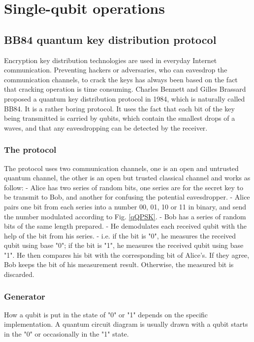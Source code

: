 \documentclass{book}
\begin{document}
\chapter{Single-qubit operations}

\section{BB84 quantum key distribution protocol}
Encryption key distribution technologies are used in everyday Internet communication. Preventing hackers or adversaries, who can eavesdrop the communication channels, to crack the keys has always been based on the fact that cracking operation is time consuming. Charles Bennett and Gilles Brassard proposed a quantum key distribution protocol in 1984, which is naturally called BB84. It is a rather boring protocol. It uses the fact that each bit of the key being transmitted is carried by qubits, which contain the smallest drops of a waves, and that any eavesdropping can be detected by the receiver.

\subsection{The protocol}
The protocol uses two communication channels, one is an open and untrusted quantum channel, the other is an open but trusted classical channel and works as follow:
- Alice has two series of random bits, one series are for the secret key to be transmit to Bob, and another for confusing the potential eavesdropper. - Alice pairs one bit from each series into a number 00, 01, 10 or 11 in binary, and send the number modulated according to Fig. \ref{qQPSK}.
- Bob has a series of random bits of the same length prepared.
- He demodulates each received qubit with the help of the bit from his series.
- 
i.e. if the bit is "0", he measures the received qubit using base "0"; if the bit is "1", he measures the received qubit using base "1". He then compares his bit with the corresponding bit of Alice's. If they agree, Bob keeps the bit of his measurement result. Otherwise, the measured bit is discarded.

\subsection{Generator}
How a qubit is put in the state of "0" or "1" depends on the specific implementation. A quantum circuit diagram is usually drawn with a qubit starts in the "0" or occasionally in the "1" state.
\end{document}
